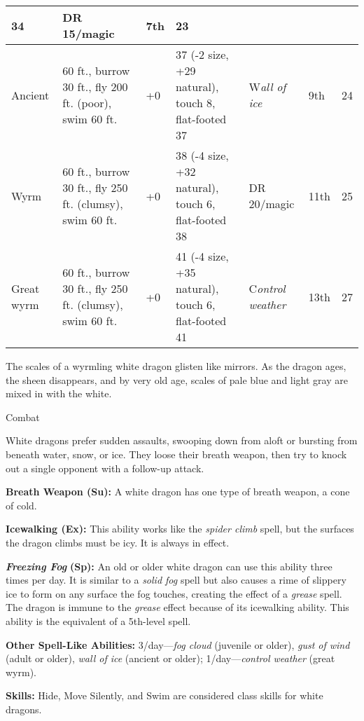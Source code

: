 \documentclass{article}
\begin{document}
\begin{tabular}{|>{\raggedright}p{26pt}|>{\raggedright}p{66pt}|>{\raggedright}p{20pt}|>{\raggedright}p{58pt}|>{\raggedright}p{66pt}|>{\raggedright}p{21pt}|>{\raggedright}p{6pt}|}
{34} & D{\small{}R 15/magic} & 7{\small{}th} & 2{\small{}3}\tabularnewline
\hline
A{\small{}ncient} & 6{\small{}0 ft., burrow 30 ft., fly 200 ft. (poor), swim 60 
ft.} & +{\small{}0} & 3{\small{}7 (-2 size, +29 natural), touch 8, flat-footed 
37} & W{\small{}\textit{all of ice}} & 9{\small{}th} & 2{\small{}4}\tabularnewline
\hline
W{\small{}yrm} & 6{\small{}0 ft., burrow 30 ft., fly 250 ft. (clumsy), swim 60 
ft.} & +{\small{}0} & 3{\small{}8 (-4 size, +32 natural), touch 6, flat-footed 
38} & D{\small{}R 20/magic} & 1{\small{}1th} & 2{\small{}5}\tabularnewline
\hline
G{\small{}reat wyrm} & 6{\small{}0 ft., burrow 30 ft., fly 250 ft. (clumsy), swim 
60 ft.} & +{\small{}0} & 4{\small{}1 (-4 size, +35 natural), touch 6, flat-footed 
41} & C{\small{}\textit{ontrol weather}} & 1{\small{}3th} & 2{\small{}7}\tabularnewline
\hline
\end{tabular}

The scales of a wyrmling white dragon glisten like mirrors. As the dragon ages, 
the sheen disappears, and by very old age, scales of pale blue and light gray are 
mixed in with the white.

Combat

White dragons prefer sudden assaults, swooping down from aloft or bursting from 
beneath water, snow, or ice. They loose their breath weapon, then try to knock 
out a single opponent with a follow-up attack.

\textbf{Breath Weapon (Su): }A white dragon has one type of breath weapon, a cone 
of cold.

\textbf{Icewalking (Ex):} This ability works like the \textit{spider climb }spell, 
but the surfaces the dragon climbs must be icy. It is always in effect.

\textit{\textbf{Freezing Fog }}\textbf{(Sp): }An old or older white dragon can 
use this ability three times per day. It is similar to a \textit{solid fog }spell 
but also causes a rime of slippery ice to form on any surface the fog touches, 
creating the effect of a \textit{grease }spell. The dragon is immune to the \textit{grease 
}effect because of its icewalking ability. This ability is the equivalent of a 
5th-level spell.

\textbf{Other Spell-Like Abilities:} 3/day---\textit{fog cloud }(juvenile or older), 
\textit{gust of wind }(adult or older), \textit{wall of ice }(ancient or older); 
1/day---\textit{control weather }(great wyrm).

\textbf{Skills: }Hide, Move Silently, and Swim are considered class skills for 
white dragons.
\end{document}
